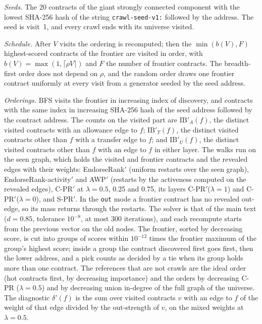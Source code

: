 \documentclass[10pt,letterpaper]{article}
\begin{document}
\textit{Seeds.} The 20 contracts of the giant strongly connected component with the lowest SHA-256 hash of the string \texttt{crawl-seed-v1:} followed by the address. The seed is visit~1, and every crawl ends with its universe visited.

\textit{Schedule.} After $V$ visits the ordering is recomputed; then the $\min(b(V),F)$ highest-scored contracts of the frontier are visited in order, with $b(V)=\max(1,\lceil\rho V\rceil)$ and $F$ the number of frontier contracts. The breadth-first order does not depend on $\rho$, and the random order draws one frontier contract uniformly at every visit from a generator seeded by the seed address.

\textit{Orderings.} BFS visits the frontier in increasing index of discovery, and contracts with the same index in increasing SHA-256 hash of the seed address followed by the contract address. The counts on the visited part are $\mathrm{IB}'_A(f)$, the distinct visited contracts with an allowance edge to $f$; $\mathrm{IB}'_T(f)$, the distinct visited contracts other than $f$ with a transfer edge to $f$; and $\mathrm{IB}'_U(f)$, the distinct visited contracts other than $f$ with an edge to $f$ in either layer. The walks run on the seen graph, which holds the visited and frontier contracts and the revealed edges with their weights: EndorseRank$'$ (uniform restarts over the seen graph), EndorseRank-activity$'$ and AWP$'$ (restarts by the activeness computed on the revealed edges), C-PR$'$ at $\lambda=0.5$, 0.25 and 0.75, its layers C-PR$'$($\lambda{=}1$) and C-PR$'$($\lambda{=}0$), and S-PR$'$. In the \texttt{out} mode a frontier contract has no revealed out-edge, so its mass returns through the restarts. The solver is that of the main text ($d=0.85$, tolerance $10^{-8}$, at most 300 iterations), and each recompute starts from the previous vector on the old nodes. The frontier, sorted by decreasing score, is cut into groups of scores within $10^{-12}$ times the frontier maximum of the group's highest score; inside a group the contract discovered first goes first, then the lower address, and a pick counts as decided by a tie when its group holds more than one contract. The references that are not crawls are the ideal order (hot contracts first, by decreasing importance) and the orders by decreasing C-PR ($\lambda=0.5$) and by decreasing union in-degree of the full graph of the universe. The diagnostic $\delta'(f)$ is the sum over visited contracts $v$ with an edge to $f$ of the weight of that edge divided by the out-strength of $v$, on the mixed weights at $\lambda=0.5$.
\end{document}
